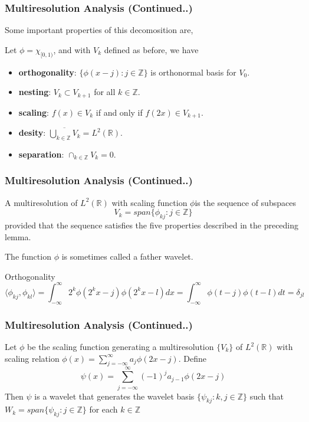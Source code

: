 \documentclass{beamer}
\begin{document}
\begin{frame}
    \frametitle{Multiresolution Analysis (Continued..)}
    Some important properties of this decomosition are, 
    \begin{lemma}[15.3.1]
        Let $\phi = \chi_{[0, 1)}$, and with $V_k$ defined as before, we have
        \begin{itemize}
            \item \textbf{orthogonality}: $\{\phi(x-j) : j \in \mathbb{Z}\}$ is orthonormal basis for $V_0$.
            \item \textbf{nesting}: $V_k \subset V_{k+1}$ for all $k \in \mathbb{Z}$.
            \item \textbf{scaling}: $f(x) \in V_k$ if and only if $f(2x) \in V_{k+1}$.
            \item \textbf{desity}: $\overline{\bigcup_{k\in\mathbb{Z}}V_k} = L^2(\mathbb{R})$.
            \item \textbf{separation}: $\cap_{k\in\mathbb{Z}} V_k = {0}$.
        \end{itemize}
    \end{lemma}

\end{frame}
\begin{frame}
    \frametitle{Multiresolution Analysis (Continued..)}
    \begin{definition}[Multiresolution]
        A multiresolution of $L^2(\mathbb{R})$ with scaling function $\phi$is the sequence of subspaces
        $$V_k = span\{ \phi_{kj} : j \in \mathbb{Z} \}$$
        provided that the sequence satisfies the five properties described in the preceding lemma.
    \end{definition}

    The function $\phi$ is sometimes called a father wavelet.

    \begin{block}{}
        Orthogonality
        $$\langle \phi_{kj}, \phi_{kl}\rangle = \int_{-\infty}^{\infty} 2^k\phi(2^kx-j)\phi(2^kx-l)dx = \int_{-\infty}^{\infty} \phi(t-j)\phi(t-l)dt = \delta_{jl}$$
    \end{block}

\end{frame}

\begin{frame}
    \frametitle{Multiresolution Analysis (Continued..)}
    \begin{theorem}[15.4.2]
        Let $\phi$ be the scaling function generating a multiresolution $\{V_k\}$ of $L^2(\mathbb{R})$ 
        with scaling relation $\phi(x) = \sum_{j=-\infty}^{\infty}a_j\phi(2x-j)$. Define
$$\psi(x) = \sum_{j=-\infty}^{\infty} (-1)^ja_{j-1}\phi(2x-j)$$
Then $\psi$ is a wavelet that generates the wavelet basis $\{\psi_{kj} : k, j \in \mathbb{Z}\}$ such that
$W_k = span\{ \psi_{kj} : j \in \mathbb{Z} \}$ for each $k \in \mathbb{Z}$

    \end{theorem}

\end{frame}
\end{document}
